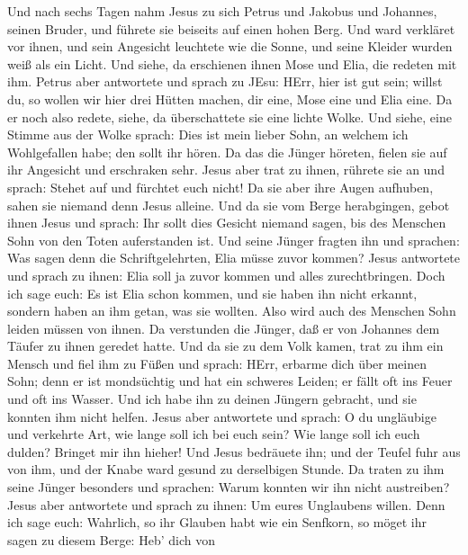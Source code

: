  Und nach sechs Tagen nahm Jesus zu sich Petrus und Jakobus
und Johannes, seinen Bruder, und führete sie beiseits auf einen hohen
Berg.  Und ward verkläret vor ihnen, und sein Angesicht
leuchtete wie die Sonne, und seine Kleider wurden weiß als ein Licht.
 Und siehe, da erschienen ihnen Mose und Elia, die redeten
mit ihm.  Petrus aber antwortete und sprach zu JEsu: HErr,
hier ist gut sein; willst du, so wollen wir hier drei Hütten machen, dir
eine, Mose eine und Elia eine.  Da er noch also redete,
siehe, da überschattete sie eine lichte Wolke. Und siehe, eine Stimme
aus der Wolke sprach: Dies ist mein lieber Sohn, an welchem ich
Wohlgefallen habe; den sollt ihr hören.  Da das die Jünger
höreten, fielen sie auf ihr Angesicht und erschraken sehr. 
Jesus aber trat zu ihnen, rührete sie an und sprach: Stehet auf und
fürchtet euch nicht!  Da sie aber ihre Augen aufhuben, sahen
sie niemand denn Jesus alleine.  Und da sie vom Berge
herabgingen, gebot ihnen Jesus und sprach: Ihr sollt dies Gesicht
niemand sagen, bis des Menschen Sohn von den Toten auferstanden ist.
 Und seine Jünger fragten ihn und sprachen: Was sagen denn
die Schriftgelehrten, Elia müsse zuvor kommen?  Jesus
antwortete und sprach zu ihnen: Elia soll ja zuvor kommen und alles
zurechtbringen.  Doch ich sage euch: Es ist Elia schon
kommen, und sie haben ihn nicht erkannt, sondern haben an ihm getan, was
sie wollten. Also wird auch des Menschen Sohn leiden müssen von ihnen.
 Da verstunden die Jünger, daß er von Johannes dem Täufer
zu ihnen geredet hatte.  Und da sie zu dem Volk kamen, trat
zu ihm ein Mensch und fiel ihm zu Füßen  und sprach: HErr,
erbarme dich über meinen Sohn; denn er ist mondsüchtig und hat ein
schweres Leiden; er fällt oft ins Feuer und oft ins Wasser.
 Und ich habe ihn zu deinen Jüngern gebracht, und sie
konnten ihm nicht helfen.  Jesus aber antwortete und
sprach: O du ungläubige und verkehrte Art, wie lange soll ich bei euch
sein? Wie lange soll ich euch dulden? Bringet mir ihn hieher!
 Und Jesus bedräuete ihn; und der Teufel fuhr aus von ihm,
und der Knabe ward gesund zu derselbigen Stunde.  Da traten
zu ihm seine Jünger besonders und sprachen: Warum konnten wir ihn nicht
austreiben?  Jesus aber antwortete und sprach zu ihnen: Um
eures Unglaubens willen. Denn ich sage euch: Wahrlich, so ihr Glauben
habt wie ein Senfkorn, so möget ihr sagen zu diesem Berge: Heb' dich von
